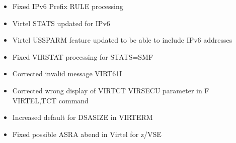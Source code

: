 \documentclass[letterpaper,10pt,english]{sphinxmanual}
\begin{document}
\begin{itemize}
\item {} 
Fixed IPv6 Prefix RULE processing

\end{itemize}

\begin{itemize}
\item {} 
Virtel STATS updated for IPv6

\end{itemize}

\begin{itemize}
\item {} 
Virtel USSPARM feature updated to be able to include IPv6 addresses

\end{itemize}

\begin{itemize}
\item {} 
Fixed VIRSTAT processing for STATS=SMF

\end{itemize}

\begin{itemize}
\item {} 
Corrected invalid message VIRT61I

\end{itemize}

\begin{itemize}
\item {} 
Corrected wrong display of VIRTCT VIRSECU parameter in F VIRTEL,TCT command

\end{itemize}

\begin{itemize}
\item {} 
Increased default for DSASIZE in VIRTERM

\end{itemize}

\begin{itemize}
\item {} 
Fixed possible ASRA abend in Virtel for z/VSE

\end{itemize}
\end{document}
